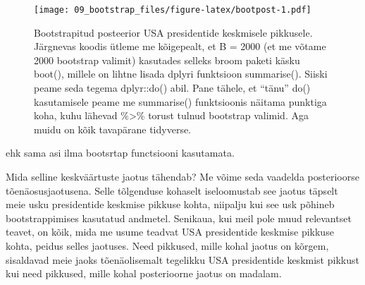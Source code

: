 \documentclass[]{book}
\newenvironment{Shaded}{\begin{snugshade}}{\end{snugshade}}
\newcommand{\KeywordTok}[1]{\textcolor[rgb]{0.13,0.29,0.53}{\textbf{#1}}}
\newcommand{\DataTypeTok}[1]{\textcolor[rgb]{0.13,0.29,0.53}{#1}}
\newcommand{\DecValTok}[1]{\textcolor[rgb]{0.00,0.00,0.81}{#1}}
\newcommand{\StringTok}[1]{\textcolor[rgb]{0.31,0.60,0.02}{#1}}
\newcommand{\CommentTok}[1]{\textcolor[rgb]{0.56,0.35,0.01}{\textit{#1}}}
\newcommand{\OtherTok}[1]{\textcolor[rgb]{0.56,0.35,0.01}{#1}}
\newcommand{\OperatorTok}[1]{\textcolor[rgb]{0.81,0.36,0.00}{\textbf{#1}}}
\newcommand{\NormalTok}[1]{#1}
\begin{document}
\begin{figure}
\centering
\texttt{[image: 09\_bootstrap\_files/figure-latex/bootpost-1.pdf]}
\caption{\label{fig:bootpost}Bootstrapitud posteerior USA presidentide keskmisele
pikkusele. Järgnevas koodis ütleme me kõigepealt, et B = 2000 (et me
võtame 2000 bootstrap valimit) kasutades selleks broom paketi käsku
boot(), millele on lihtne lisada dplyri funktsioon summarise(). Siiski
peame seda tegema dplyr::do() abil. Pane tähele, et ``tänu'' do()
kasutamisele peame me summarise() funktsioonis näitama punktiga koha,
kuhu lähevad \%\textgreater{}\% torust tulnud bootstrap valimid. Aga
muidu on kõik tavapärane tidyverse.}
\end{figure}

ehk sama asi ilma bootsrtap functsiooni kasutamata.

\begin{Shaded}
\end{Shaded}

Mida selline keskväärtuste jaotus tähendab? Me võime seda vaadelda
posterioorse tõenäosusjaotusena. Selle tõlgenduse kohaselt iseloomustab
see jaotus täpselt meie usku presidentide keskmise pikkuse kohta,
niipalju kui see usk põhineb bootstrappimises kasutatud andmetel.
Senikaua, kui meil pole muud relevantset teavet, on kõik, mida me usume
teadvat USA presidentide keskmise pikkuse kohta, peidus selles jaotuses.
Need pikkused, mille kohal jaotus on kõrgem, sisaldavad meie jaoks
tõenäolisemalt tegelikku USA presidentide keskmist pikkust kui need
pikkused, mille kohal posterioorne jaotus on madalam.
\end{document}
